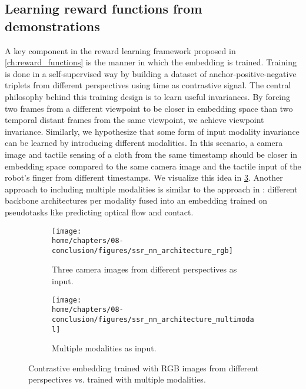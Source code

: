 \documentclass[\home/main.tex]{subfiles}
\begin{document}
\subsection{Learning reward functions from demonstrations} \label{subsec:conc_future_tcn}
A key component in the reward learning framework proposed in \cref{ch:reward_functions} is the manner in which the embedding is trained. Training is done in a self-supervised way by building a dataset of anchor-positive-negative triplets from different perspectives using time as contrastive signal. The central philosophy behind this training design is to learn useful invariances. By forcing two frames from a different viewpoint to be closer in embedding space than two temporal distant frames from the same viewpoint, we achieve viewpoint invariance. Similarly, we hypothesize that some form of input modality invariance can be learned by introducing different modalities. In this scenario, a camera image and tactile sensing of a cloth from the same timestamp should be closer in embedding space compared to the same camera image and the tactile input of the robot's finger from different timestamps. We visualize this idea in \cref{fig:conc_multimodal_tcn}. %
Another approach to including multiple modalities is similar to the approach in \autocite{Lee2019}: different backbone architectures per modality fused into an embedding trained on pseudotasks like predicting optical flow and contact.

\begin{figure}[htpb]{}
    \centering
    \begin{subfigure}[b]{0.90\textwidth}
        \centering
        \texttt{[image: \\home/chapters/08-conclusion/figures/ssr\_nn\_architecture\_rgb]}
        \caption{Three camera images from different perspectives as input.}
        \label{fig:conc_tcn_rgb}
    \end{subfigure}
    \par\bigskip %
    \begin{subfigure}[b]{0.90\textwidth}
        \centering
        \texttt{[image: \\home/chapters/08-conclusion/figures/ssr\_nn\_architecture\_multimodal]}
        \caption{Multiple modalities as input.}
        \label{fig:conc_tcn_multimodal}
    \end{subfigure}

    \caption[Multimodal contrastive embedding.]{Contrastive embedding trained with RGB images from different perspectives vs. trained with multiple modalities.}
    \label{fig:conc_multimodal_tcn}
\end{figure}
\end{document}
